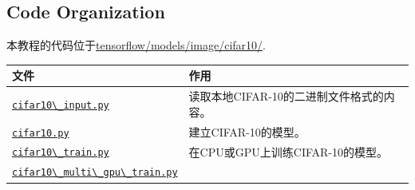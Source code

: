 \subsection {Code Organization}

本教程的代码位于\href{https://tensorflow.googlesource.com/tensorflow/+/master/tensorflow/models/image/cifar10/}{tensorflow/models/image/cifar10/}.



\begin{longtable}[c]{@{}ll@{}}
\toprule
\begin{minipage}[b]{0.05\columnwidth}\raggedright\strut
文件
\strut\end{minipage} &
\begin{minipage}[b]{0.05\columnwidth}\raggedright\strut
作用
\strut\end{minipage}\tabularnewline
\midrule
\endhead
\begin{minipage}[t]{0.05\columnwidth}\raggedright\strut
\href{https://tensorflow.googlesource.com/tensorflow/+/master/tensorflow/models/image/cifar10/cifar10_input.py}{\lstinline{cifar10\_input.py}}
\strut\end{minipage} &
\begin{minipage}[t]{0.05\columnwidth}\raggedright\strut
读取本地CIFAR-10的二进制文件格式的内容。
\strut\end{minipage}\tabularnewline
\begin{minipage}[t]{0.05\columnwidth}\raggedright\strut
\href{https://tensorflow.googlesource.com/tensorflow/+/master/tensorflow/models/image/cifar10/cifar10.py}{\lstinline{cifar10.py}}
\strut\end{minipage} &
\begin{minipage}[t]{0.05\columnwidth}\raggedright\strut
建立CIFAR-10的模型。
\strut\end{minipage}\tabularnewline
\begin{minipage}[t]{0.05\columnwidth}\raggedright\strut
\href{https://tensorflow.googlesource.com/tensorflow/+/master/tensorflow/models/image/cifar10/cifar10_train.py}{\lstinline{cifar10\_train.py}}
\strut\end{minipage} &
\begin{minipage}[t]{0.05\columnwidth}\raggedright\strut
在CPU或GPU上训练CIFAR-10的模型。
\strut\end{minipage}\tabularnewline
\begin{minipage}[t]{0.05\columnwidth}\raggedright\strut
\href{https://tensorflow.googlesource.com/tensorflow/+/master/tensorflow/models/image/cifar10/cifar10_multi_gpu_train.py}{\lstinline{cifar10\_multi\_gpu\_train.py}}

\end{minipage}
\end{longtable}
